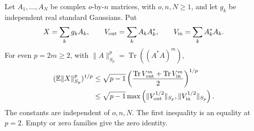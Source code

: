 \begin{proposition}\label{P:finite-gaussian-matrix}
  Let $A_1,\ldots,A_N$ be complex $o$-by-$n$ matrices, with $o,n,N \ge 1$, and
  let $g_k$ be independent real standard Gaussians. Put
  \[
    X=\sum_k g_kA_k,\qquad V_{\rm out}=\sum_k A_kA_k^*,
    \qquad V_{\rm in}=\sum_k A_k^*A_k.
  \]
  For even $p = 2m \ge 2$, with $\|A\|_{S_p}^p = \operatorname{Tr}((A^*A)^m)$,
  \begin{align}
    (\mathbb{E}\|X\|_{S_p}^p)^{1/p}
    &\le \sqrt{p-1}\left(
    \frac{\operatorname{Tr}V_{\rm out}^m+
    \operatorname{Tr}V_{\rm in}^m}{2}\right)^{1/p}
    \label{E:finite-gaussian-average}\\
    &\le \sqrt{p-1}\max\left(
    \|V_{\rm out}^{1/2}\|_{S_p},\|V_{\rm in}^{1/2}\|_{S_p}\right).
    \label{E:finite-gaussian-maximum}
  \end{align}
  The constants are independent of $o,n,N$. The first inequality is an equality
  at $p = 2$. Empty or zero families give the zero identity.
\end{proposition}

